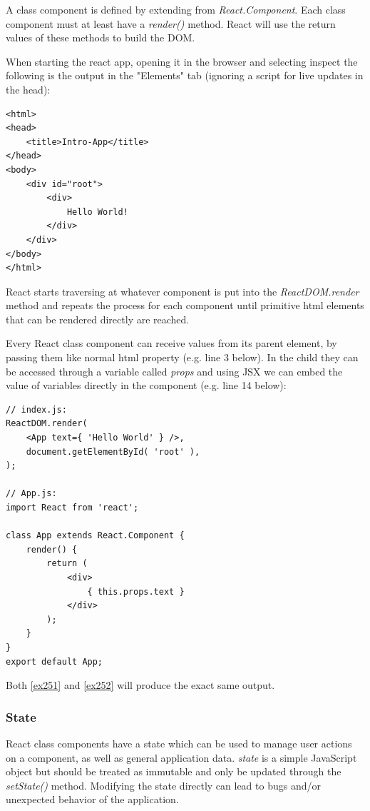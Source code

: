 A class component is defined by extending from \emph{React.Component}. Each class component must at least have a \emph{render()} method. React will use the return values of these methods to build the DOM.

When starting the react app, opening it in the browser and selecting inspect the following is the output in the "Elements" tab (ignoring a script for live updates in the head):

\lstset{language=HTML}
\begin{lstlisting}[caption={Resulting HTML after building}]
<html> 
<head>
	<title>Intro-App</title>
</head>
<body>
	<div id="root">
		<div>
			Hello World!
		</div>
	</div>
</body>
</html>
\end{lstlisting}

React starts traversing at whatever component is put into the \emph{ReactDOM.render} method and repeats the process for each component until primitive html elements that can be rendered directly are reached.

Every React class component can receive values from its parent element, by passing them like normal html property (e.g. line 3 below). In the child they can be accessed through a variable called \emph{props} and using JSX we can embed the value of variables directly in the component (e.g. line 14 below):

\lstset{language=JavaScript}
\begin{lstlisting}[caption={Using Props},label={ex252}]
// index.js:
ReactDOM.render(
	<App text={ 'Hello World' } />,
	document.getElementById( 'root' ),
);

// App.js:
import React from 'react';

class App extends React.Component {
	render() {
		return (
			<div>
				{ this.props.text }
			</div>
		);
	}
}
export default App;
\end{lstlisting}
Both \autoref{ex251} and \autoref{ex252} will produce the exact same output.

\subsubsection{State}
React class components have a state which can be used to manage user actions on a component, as well as general application data. \emph{state} is a simple JavaScript object but should be treated as immutable and only be updated through the \emph{setState()} method. Modifying the state directly can lead to bugs and/or unexpected behavior of the application.

